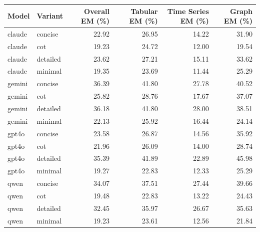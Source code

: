 \begin{tabular}{llrrrr}
\toprule
Model & Variant & Overall EM (\%) & Tabular EM (\%) & Time Series EM (\%) & Graph EM (\%) \\
\midrule
claude & concise & 22.92 & 26.95 & 14.22 & 31.90 \\
claude & cot & 19.23 & 24.72 & 12.00 & 19.54 \\
claude & detailed & 23.62 & 27.21 & 15.11 & 33.62 \\
claude & minimal & 19.35 & 23.69 & 11.44 & 25.29 \\
gemini & concise & 36.39 & 41.80 & 27.78 & 40.52 \\
gemini & cot & 25.82 & 28.76 & 17.67 & 37.07 \\
gemini & detailed & 36.18 & 41.80 & 28.00 & 38.51 \\
gemini & minimal & 22.13 & 25.92 & 16.44 & 24.14 \\
gpt4o & concise & 23.58 & 26.87 & 14.56 & 35.92 \\
gpt4o & cot & 21.96 & 26.09 & 14.00 & 28.74 \\
gpt4o & detailed & 35.39 & 41.89 & 22.89 & 45.98 \\
gpt4o & minimal & 19.27 & 22.83 & 12.33 & 25.29 \\
qwen & concise & 34.07 & 37.51 & 27.44 & 39.66 \\
qwen & cot & 19.48 & 22.83 & 13.22 & 24.43 \\
qwen & detailed & 32.45 & 35.97 & 26.67 & 35.63 \\
qwen & minimal & 19.23 & 23.61 & 12.56 & 21.84 \\
\bottomrule
\end{tabular}
